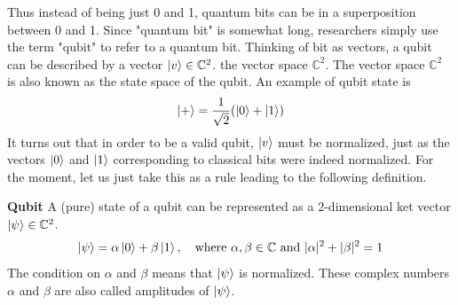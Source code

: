 Thus instead of being just 0 and 1, quantum bits can be in a superposition between 0 and 1. Since "quantum bit" is somewhat long, researchers simply use the term "qubit" to refer to a quantum bit. Thinking of bit as vectors, a qubit can be described by a vector $\ket{v} \in \mathbb{C}^2$. the vector space $\mathbb{C}^2$. The vector space $\mathbb{C}^2$ is also known as the state space of the qubit. An example of qubit state is
\[
\ket{+}=\frac{1}{\sqrt{2}}(\ket{0}+\ket{1})
\]
It turns out that in order to be a valid qubit, $\ket{v}$ must be normalized, just as the vectors $\ket{0}$ and $\ket{1}$ corresponding to classical bits were indeed normalized. For the moment, let us just take this as a rule leading to the following definition.

\begin{definition}
    \textbf{Qubit} A (pure) state of a qubit can be represented as a 2-dimensional ket vector $\ket{\psi} \in \mathbb{C}^2$.
    \[
    \ket{\psi}=\alpha\ket{0}+\beta\ket{1}, \quad \text{where $\alpha,\beta \in \mathbb{C}$ and $|\alpha|^2+|\beta|^2=1$}
    \]
    The condition on $\alpha$ and $\beta$ means that $\ket{\psi}$ is normalized. These complex numbers $\alpha$ and $\beta$ are also called amplitudes of $\ket{\psi}$.
\end{definition}

